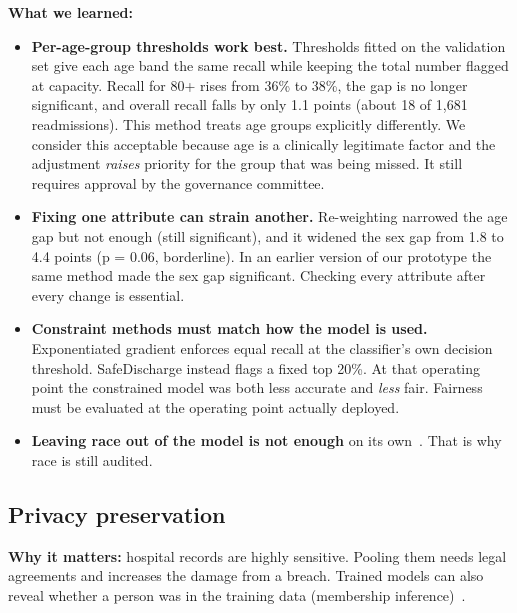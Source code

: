\documentclass[10pt,a4paper]{article}
\newcommand{\lead}[1]{\needspace{4\baselineskip}\textbf{#1}}
\begin{document}
\lead{What we learned:}
\begin{itemize}
\item \textbf{Per-age-group thresholds work best.} Thresholds fitted on the validation set give each age band the same recall while keeping the total number flagged at capacity. Recall for 80+ rises from 36\% to 38\%, the gap is no longer significant, and overall recall falls by only 1.1 points (about 18 of 1,681 readmissions). This method treats age groups explicitly differently. We consider this acceptable because age is a clinically legitimate factor and the adjustment \emph{raises} priority for the group that was being missed. It still requires approval by the governance committee.
\item \textbf{Fixing one attribute can strain another.} Re-weighting narrowed the age gap but not enough (still significant), and it widened the sex gap from 1.8 to 4.4 points (p = 0.06, borderline). In an earlier version of our prototype the same method made the sex gap significant. Checking every attribute after every change is essential.
\item \textbf{Constraint methods must match how the model is used.} Exponentiated gradient enforces equal recall at the classifier's own decision threshold. SafeDischarge instead flags a fixed top 20\%. At that operating point the constrained model was both less accurate and \emph{less} fair. Fairness must be evaluated at the operating point actually deployed.
\item \textbf{Leaving race out of the model is not enough} on its own~\cite{chen2018}. That is why race is still audited.
\end{itemize}

\subsection{Privacy preservation}\label{sec:4.3}

\textbf{Why it matters:} hospital records are highly sensitive. Pooling them needs legal agreements and increases the damage from a breach. Trained models can also reveal whether a person was in the training data (membership inference)~\cite{shokri2017}.
\end{document}
